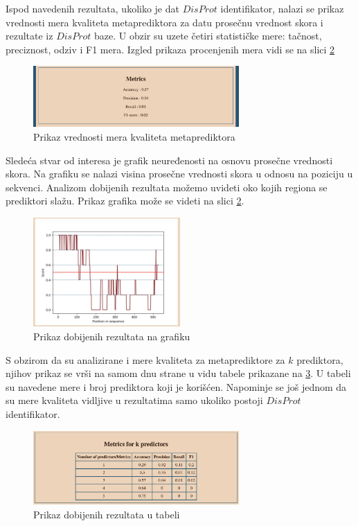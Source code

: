 Ispod navedenih rezultata, ukoliko je dat $DisProt$ identifikator, nalazi se prikaz vrednosti mera kvaliteta metaprediktora za datu prosečnu vrednost skora i rezultate iz $DisProt$ baze. U obzir su uzete četiri statističke mere: tačnost, preciznost, odziv i F1 mera. Izgled prikaza procenjenih mera vidi se na slici \ref{fig:grafik}

\begin{figure}[H]
	\centering
    \includegraphics[width=0.7\textwidth]{Figures/App/seventh_screen.png}
    \caption{Prikaz vrednosti mera kvaliteta metaprediktora}
    \label{fig:metrike}
\end{figure}

Sledeća stvar od interesa je grafik neuređenosti na osnovu prosečne vrednosti skora. Na grafiku se nalazi visina prosečne vrednosti skora u odnosu na poziciju u sekvenci.
Analizom dobijenih rezultata možemo uvideti oko kojih regiona se prediktori slažu. Prikaz grafika može se videti na slici \ref{fig:grafik}.
\begin{figure}[H]
	\centering
    \includegraphics[width=0.5\textwidth]{Figures/App/sixth_screen.png}
    \caption{Prikaz dobijenih rezultata na grafiku}
    \label{fig:grafik}
\end{figure}

S obzirom da su analizirane i mere kvaliteta za metaprediktore za $k$ prediktora, njihov prikaz se vrši na samom dnu strane u vidu tabele prikazane na \ref{fig:detailed}. U tabeli su navedene mere i broj prediktora koji je korišćen. Napominje se još jednom da su mere kvaliteta vidljive u rezultatima samo ukoliko postoji $DisProt$ identifikator.
\begin{figure}[H]
	\centering
    \includegraphics[width=0.7\textwidth]{Figures/App/detailed.png}
    \caption{Prikaz dobijenih rezultata u tabeli}
    \label{fig:detailed}
\end{figure}

